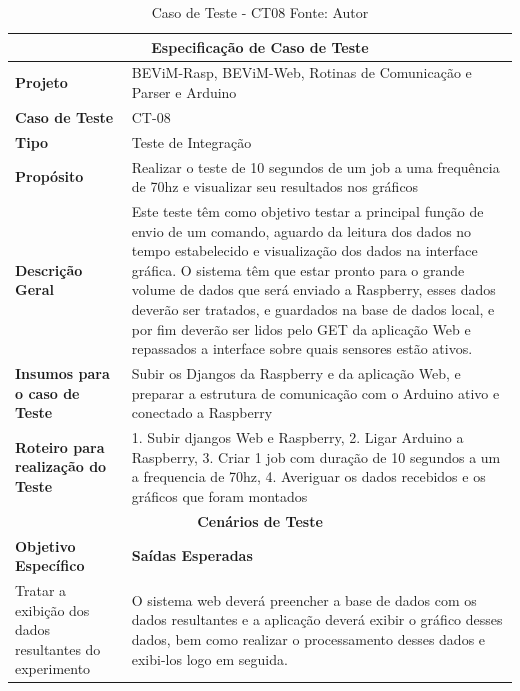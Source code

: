 \begin{table}[H]
    \begin{center}
        \begin{tabular}{|p{5cm}|p{12cm}|}
            \hline
            \multicolumn{2}{|c|}{\textbf{Especificação de Caso de Teste}} \\ \hline
                \textbf{Projeto}                                        & BEViM-Rasp, BEViM-Web, Rotinas de Comunicação e Parser e Arduino \\ \hline
                \textbf{Caso de Teste}                             & CT-08 \\ \hline
                \textbf{Tipo}                                             & Teste de Integração \\ \hline
                \textbf{Propósito}                                     & Realizar o teste de 10 segundos de um job a uma frequência de 70hz e visualizar seu resultados nos gráficos \\ \hline
                \textbf{Descrição Geral}                           & Este teste têm como objetivo testar a principal função de envio de um comando, aguardo da leitura dos dados no tempo estabelecido e visualização dos dados na interface gráfica. O sistema têm que estar pronto para o grande volume de dados que será enviado a Raspberry, esses dados deverão ser tratados, e guardados na base de dados local, e por fim deverão ser lidos pelo GET da aplicação Web e repassados a interface sobre quais sensores estão ativos. \\ \hline
                \textbf{Insumos para o caso de Teste}    & Subir os Djangos da Raspberry e da aplicação Web, e preparar a estrutura de comunicação com o Arduino ativo e conectado a Raspberry \\ \hline
                \textbf{Roteiro para realização do Teste}&  1. Subir djangos Web e Raspberry, 2. Ligar Arduino a Raspberry, 3. Criar 1 job com duração de 10 segundos a um a frequencia de 70hz, 4. Averiguar os dados recebidos e os gráficos que foram montados  \\ \hline
            \multicolumn{2}{|c|}{\textbf{Cenários de Teste}} \\ \hline
                \textbf{Objetivo Específico}                      & \textbf{Saídas Esperadas} \\ \hline
                Tratar a exibição dos dados resultantes do experimento & O sistema web deverá preencher a base de dados com os dados resultantes e a aplicação deverá exibir o gráfico desses dados, bem como realizar o processamento desses dados e exibi-los logo em seguida. \\ \hline
        \end{tabular}
    \end{center}
    \caption[Caso de Teste - CT08]{Caso de Teste - CT08
    \protect Fonte: Autor}
    \label{CT-08}
\end{table}

